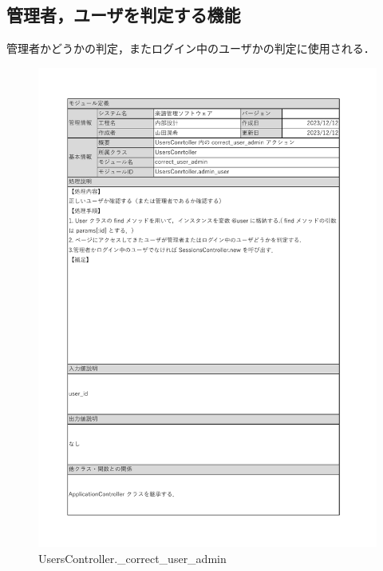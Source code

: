 \subsection*{管理者，ユーザを判定する機能}
管理者かどうかの判定，またログイン中のユーザかの判定に使用される．
\begin{figure}[H]
    \centering
    \includegraphics[scale=0.5]{img/Method/UsersController_correct_user_admin.pdf}
    \caption{UsersController.\_correct\_user\_admin}
\end{figure}
\clearpage

